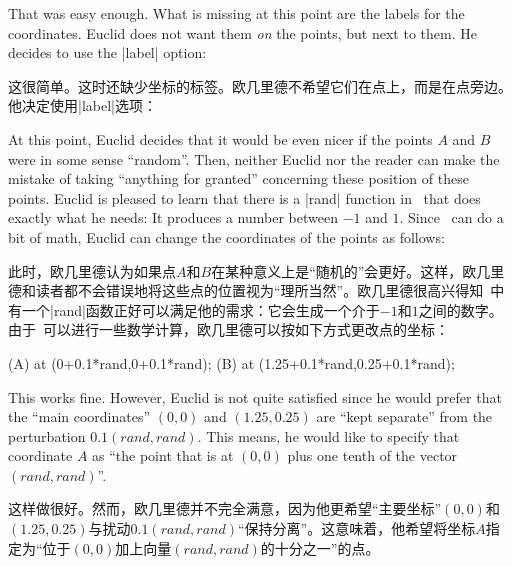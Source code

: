 \begin{paracol}{2}
That was easy enough. What is missing at this point are the labels for the
coordinates. Euclid does not want them \emph{on} the points, but next to them.
He decides to use the |label| option:

这很简单。这时还缺少坐标的标签。欧几里德不希望它们在点上，而是在点旁边。他决定使用|label|选项：
%
\begin{codeexample}[]
\end{codeexample}

At this point, Euclid decides that it would be even nicer if the points $A$ and
$B$ were in some sense ``random''. Then, neither Euclid nor the reader can make
the mistake of taking ``anything for granted'' concerning these position of
these points. Euclid is pleased to learn that there is a |rand| function in
\tikzname\ that does exactly what he needs: It produces a number between $-1$
and $1$. Since \tikzname\ can do a bit of math, Euclid can change the
coordinates of the points as follows:
%

此时，欧几里德认为如果点$A$和$B$在某种意义上是“随机的”会更好。这样，欧几里德和读者都不会错误地将这些点的位置视为“理所当然”。欧几里德很高兴得知\tikzname\ 中有一个|rand|函数正好可以满足他的需求：它会生成一个介于$-1$和$1$之间的数字。由于\tikzname\ 可以进行一些数学计算，欧几里德可以按如下方式更改点的坐标：
\begin{codeexample}
\coordinate [...] (A) at (0+0.1*rand,0+0.1*rand);
\coordinate [...] (B) at (1.25+0.1*rand,0.25+0.1*rand);
\end{codeexample}

This works fine. However, Euclid is not quite satisfied since he would prefer
that the ``main coordinates'' $(0,0)$ and $(1.25,0.25)$ are ``kept separate''
from the perturbation $0.1(\mathit{rand},\mathit{rand})$. This means, he would
like to specify that coordinate $A$ as ``the point that is at $(0,0)$ plus one
tenth of the vector  $(\mathit{rand},\mathit{rand})$''.


这样做很好。然而，欧几里德并不完全满意，因为他更希望“主要坐标”$(0,0)$和$(1.25,0.25)$与扰动$0.1(\mathit{rand},\mathit{rand})$“保持分离”。这意味着，他希望将坐标$A$指定为“位于$(0,0)$加上向量$(\mathit{rand},\mathit{rand})$的十分之一”的点。


\end{paracol}
